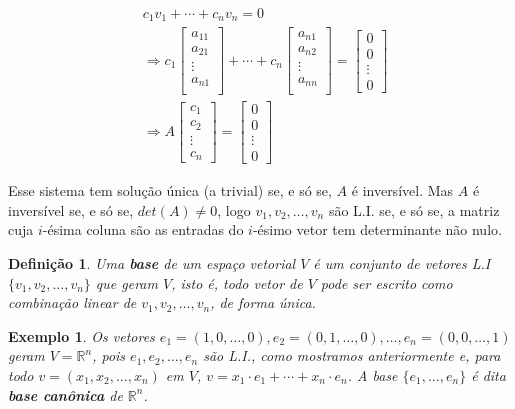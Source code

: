 \documentclass{article}
\newtheorem*{definition}{Definição}
\newtheorem*{example}{Exemplo}
\begin{document}
\begin{align*}
&c_1v_1 + \cdots + c_nv_n = 0 \\
&\Rightarrow c_1\begin{bmatrix}
a_{11}\\
a_{21}\\
\vdots\\
a_{n1}\\
\end{bmatrix} + \cdots + c_n\begin{bmatrix}
a_{n1}\\
a_{n2}\\
\vdots\\
a_{nn}\\
\end{bmatrix} = \begin{bmatrix}
0\\
0\\
\vdots \\
0
\end{bmatrix}\\
&\Rightarrow A\begin{bmatrix}
c_1\\
c_2\\
\vdots\\
c_n
\end{bmatrix} = \begin{bmatrix}
0\\
0\\
\vdots\\
0
\end{bmatrix}
\end{align*}

\par\vspace{0.3cm} Esse sistema tem solução única (a trivial) se, e só se, $A$ é inversível. Mas $A$ é inversível se, e só se, $det(A)\neq 0$, logo $v_1, v_2, \dots, v_n$ são L.I. se, e só se, a matriz cuja $i$-ésima coluna são as entradas do $i$-ésimo vetor tem determinante não nulo.

\begin{definition}
	Uma \textbf{base} de um espaço vetorial $V$ é um conjunto de vetores L.I $\{v_1, v_2, \dots, v_n\}$ que geram $V$, isto é, todo vetor de $V$ pode ser escrito como combinação linear de $v_1, v_2, \dots, v_n$, de forma única. 
\end{definition}

\begin{example}
	Os vetores $e_1 = (1, 0, \dots, 0), e_2 = (0, 1, \dots, 0), \dots, e_n = (0, 0, \dots, 1)$ geram $V = \mathbb{R}^n$, pois $e_1, e_2, \dots, e_n$ são L.I., como mostramos anteriormente e, para todo $v = (x_1, x_2, \dots, x_n)$ em $V$, $v = x_1\cdot e_1 + \cdots + x_n\cdot e_n$. A base $\{e_1, \dots, e_n\}$ é dita \textbf{base canônica} de $\mathbb{R}^n$.
\end{example}
\end{document}
